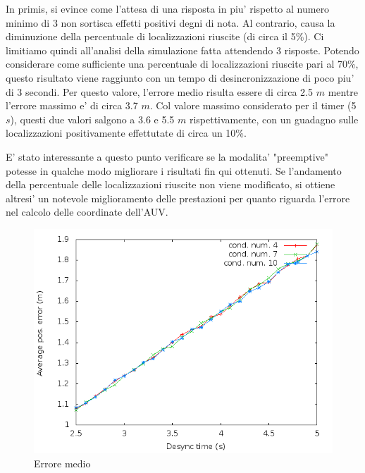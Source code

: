 In primis, si evince come l'attesa di una risposta in piu' rispetto al numero minimo di 3 non sortisca effetti positivi degni di nota. Al contrario, causa la diminuzione della percentuale di localizzazioni riuscite (di circa il 5\%).
Ci limitiamo quindi all'analisi della simulazione fatta attendendo 3 risposte.
Potendo considerare come sufficiente una percentuale di localizzazioni riuscite pari al 70\%, questo risultato viene raggiunto con un tempo di desincronizzazione di poco piu' di 3 secondi. Per questo valore, l'errore medio risulta essere di circa 2.5 $m$ mentre l'errore massimo e' di circa 3.7 $m$.
Col valore massimo considerato per il timer (5 $s$), questi due valori salgono a 3.6 e 5.5 $m$ rispettivamente, con un guadagno sulle localizzazioni positivamente effettutate di circa un 10\%.

E' stato interessante a questo punto verificare se la modalita' "preemptive" potesse in qualche modo migliorare i risultati fin qui ottenuti.
Se l'andamento della percentuale delle localizzazioni riuscite non viene modificato, si ottiene altresi' un notevole miglioramento delle prestazioni per quanto riguarda l'errore nel calcolo delle coordinate dell'AUV.

\begin{figure}
    \centering
    \includegraphics[scale=0.5]{squaresimulation/avposerrorreq3preempt1drop0speed1.png}
    \caption{Errore medio}
    \label{fig:squaresimulation/avposerrorreq3preempt1drop0speed1}
\end{figure}

